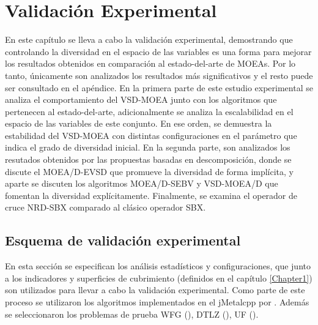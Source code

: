 \chapter{Validación Experimental} %

\label{Chapter6}


En este capítulo se lleva a cabo la validación experimental, demostrando que controlando la diversidad en el espacio de las variables es una forma para mejorar los resultados obtenidos en comparación al estado-del-arte de MOEAs. 
%
Por lo tanto, únicamente son analizados los resultados más significativos y el resto puede ser consultado en el apéndice.
%
En la primera parte de este estudio experimental se analiza el comportamiento del VSD-MOEA junto con los algoritmos que pertenecen al estado-del-arte, adicionalmente se analiza la escalabilidad en el espacio de las variables de este conjunto.
%
En ese orden, se demuestra la estabilidad del VSD-MOEA con distintas configuraciones en el parámetro que indica el grado de diversidad inicial.
%
En la segunda parte, son analizados los resutados obtenidos por las propuestas basadas en descomposición, donde se discute el MOEA/D-EVSD que promueve la diversidad de forma implícita, y aparte se discuten los algoritmos MOEA/D-SEBV y VSD-MOEA/D que fomentan la diversidad explícitamente.
%
%
Finalmente, se examina el operador de cruce NRD-SBX comparado al clásico operador SBX.

%

\section{Esquema de validación experimental}

En esta sección se especifican los análisis estadísticos y configuraciones, que junto a los indicadores y superficies de cubrimiento (definidos en el capítulo \ref{Chapter1}) son utilizados para llevar a cabo la validación experimental.
%
Como parte de este proceso se utilizaron los algoritmos implementados en el jMetalcpp por \cite{Joel:jMetal}.
%
Además se seleccionaron los problemas de prueba WFG (\cite{Joel:WFG}), DTLZ (\cite{Joel:DTLZ_2}), UF (\cite{Joel:CEC2009}).
%

